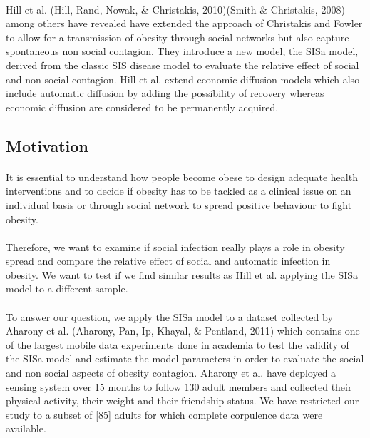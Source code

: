 \documentclass[11pt]{article}
\begin{document}
\paragraph{}
Hill et al. (Hill, Rand, Nowak, & Christakis, 2010)(Smith & Christakis, 2008) among others  have revealed have extended the approach of Christakis and Fowler to allow for a transmission of obesity through social networks but also capture spontaneous non social contagion. They introduce a new model, the SISa model, derived from the classic SIS disease model to evaluate the relative effect of social and non social contagion. Hill et al. extend economic diffusion models which also include automatic diffusion by adding the possibility of recovery whereas economic diffusion are considered to be permanently acquired.

\subsection{Motivation}
\paragraph{}
It is essential to understand how people become obese to design adequate health interventions and to decide if obesity has to be tackled as a clinical issue on an individual basis or through social network to spread positive behaviour to fight obesity.

\paragraph{}
Therefore, we want to examine if social infection really plays a role in obesity spread and compare the  relative effect of social and automatic infection in obesity. We want to test if we find similar results as Hill et al. applying the SISa model to a different sample.

\paragraph{}
To answer our question, we apply the SISa model to a dataset collected by Aharony et al. (Aharony, Pan, Ip, Khayal, & Pentland, 2011) which contains one of the largest mobile data experiments done in academia to test the validity of the SISa model and estimate the model parameters in order to evaluate the social and non social aspects of obesity contagion. Aharony et al. have deployed a sensing system over 15 months to follow 130 adult members and collected their physical activity, their weight and their friendship status. We have restricted our study to a subset of [85] adults for which complete corpulence data were available.
\end{document}
